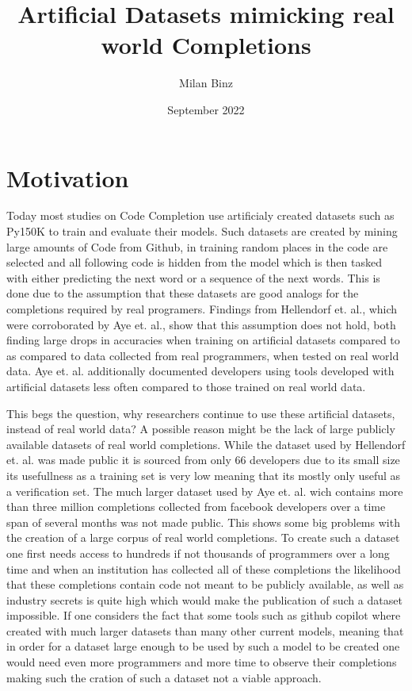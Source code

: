 \documentclass[sigplan,screen,10pt]{acmart}
\title{Artificial Datasets mimicking real world Completions}
\author{Milan Binz}
\date{September 2022}
\begin{document}
\maketitle

\section{Motivation}
Today most studies on Code Completion use artificialy created datasets such as Py150K to train and evaluate their models.
Such datasets are created by mining large amounts of Code from Github, in training random places in the code are selected and all following code is hidden from the model which is then tasked with either predicting the next word or a sequence of the next words.
This is done due to the assumption that these datasets are good analogs for the completions required by real programers.
Findings from Hellendorf et. al.\cite{8812116}, which were corroborated by Aye et. al.\cite{https://doi.org/10.48550/arxiv.2011.04542}, show that this assumption does not hold, both finding large drops in accuracies when training on artificial datasets compared to as compared to data collected from real programmers, when tested on real world data. 
Aye et. al.\cite{https://doi.org/10.48550/arxiv.2011.04542} additionally documented developers using tools developed with artificial datasets less often compared to those trained on real world data.

This begs the question, why researchers continue to use these artificial datasets, instead of real world data?
A possible reason might be the lack of large publicly available datasets of real world completions.
While the dataset used by Hellendorf et. al.\cite{8812116} was made public it is sourced from only 66 developers due to its small size its usefullness as a training set is very low meaning that its mostly only useful as a verification set.
The much larger dataset used by Aye et. al.\cite{https://doi.org/10.48550/arxiv.2011.04542} wich contains more than three million completions collected from facebook developers over a time span of several months was not made public.
This shows some big problems with the creation of a large corpus of real world completions.
To create such a dataset one first needs access to hundreds if not thousands of programmers over a long time and when an institution has collected all of these completions the likelihood that these completions contain code not meant to be publicly available, as well as industry secrets is quite high which would make the publication of such a dataset impossible.
If one considers the fact that some tools such as github copilot where created with much larger datasets than many other current models\cite{2107.03374}, meaning that in order for a dataset large enough to be used by such a model to be created one would need even more programmers and more time to observe their completions making such the cration of such a dataset not a viable approach.
\end{document}
